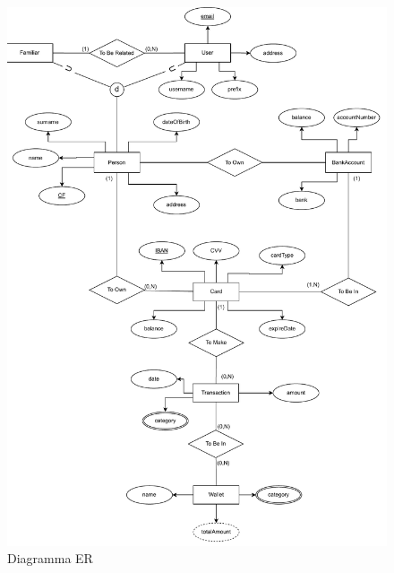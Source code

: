 \begin{figure}[ht!]
    \centering
    \includegraphics[scale=0.55]{pdfs/ERdiagram.drawio.pdf}
    \caption{Diagramma ER}\label{ER}
\end{figure}